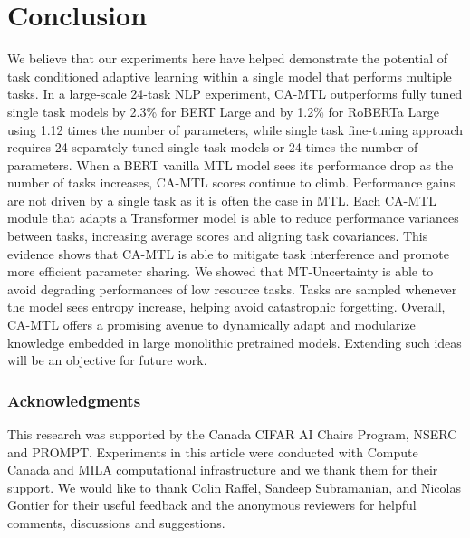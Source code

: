 \documentclass{article} \usepackage{iclr2021_conference,times}
\begin{document}
\vspace{-.15cm}
\section{Conclusion}
We believe that our experiments here have helped demonstrate the potential of task conditioned adaptive learning within a single model that performs multiple tasks.
In a large-scale 24-task NLP experiment, CA-MTL outperforms fully tuned single task models by 2.3\% for BERT Large and by 1.2\% for RoBERTa Large using 1.12 times the number of parameters, while single task fine-tuning approach requires 24 separately tuned single task models or 24 times the number of parameters. When a BERT vanilla MTL model sees its performance drop as the number of tasks increases, CA-MTL scores continue to climb. Performance gains are not driven by a single task as it is often the case in MTL. Each CA-MTL module that adapts a Transformer model is able to reduce performance variances between tasks, increasing average scores and aligning task covariances. This evidence shows that CA-MTL is able to mitigate task interference and promote more efficient parameter sharing. We showed that MT-Uncertainty is able to avoid degrading performances of low resource tasks. Tasks are sampled whenever the model sees entropy increase, helping avoid catastrophic forgetting. Overall, CA-MTL offers a promising avenue to dynamically adapt and modularize knowledge embedded in large monolithic pretrained models. Extending such ideas will be an objective for future work. 














\clearpage

\subsubsection*{Acknowledgments}
This research was supported by the Canada CIFAR AI Chairs Program, NSERC and PROMPT. Experiments in this article were conducted with Compute Canada and MILA computational infrastructure and we thank them for their support. We would like to thank Colin Raffel, Sandeep Subramanian, and Nicolas Gontier for their useful feedback and the anonymous reviewers for helpful comments, discussions and suggestions. 
\end{document}
